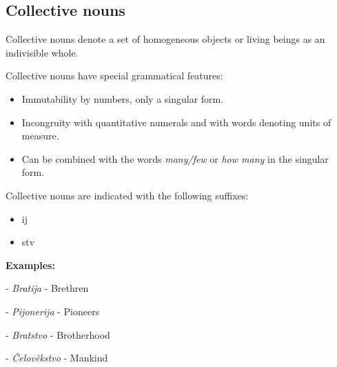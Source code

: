 \subsection{Collective nouns}

Collective nouns denote a set of homogeneous objects or living beings as an indivisible whole.

Collective nouns have special grammatical features:

\begin{itemize}
	\item Immutability by numbers, only a singular form.
	\item Incongruity with quantitative numerals and with words denoting units of measure.
	\item Can be combined with the words \textit{many/few} or \textit{how many} in the singular form.
\end{itemize}

Collective nouns are indicated with the following suffixes:

\begin{itemize}
	\item ij
	\item stv
\end{itemize}

\textbf{Examples:}

- \textit{Bratija} - Brethren

- \textit{Pijonerija} - Pioneers

- \textit{Bratstvo} - Brotherhood

- \textit{Čelověkstvo} - Mankind

